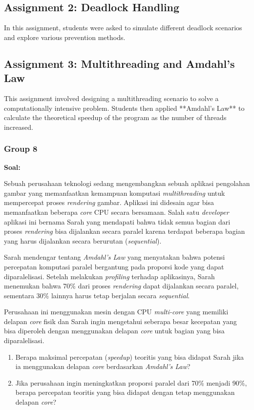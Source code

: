 \documentclass[12pt]{article}
\begin{document}
\subsection{Assignment 2: Deadlock Handling}
In this assignment, students were asked to simulate different deadlock scenarios and explore various prevention methods.

\subsection{Assignment 3: Multithreading and Amdahl's Law}
This assignment involved designing a multithreading scenario to solve a computationally intensive problem. Students then applied **Amdahl's Law** to calculate the theoretical speedup of the program as the number of threads increased.
\subsubsection{Group 8}
\textbf{Soal:}
\par Sebuah perusahaan teknologi sedang mengembangkan sebuah aplikasi pengolahan gambar yang memanfaatkan kemampuan komputasi \textit{multithreading} untuk mempercepat proses \textit{rendering} gambar. Aplikasi ini didesain agar bisa memanfaatkan beberapa \textit{core} CPU secara bersamaan. Salah satu \textit{developer} aplikasi ini bernama Sarah yang mendapati bahwa tidak semua bagian dari proses \textit{rendering} bisa dijalankan secara paralel karena terdapat beberapa bagian yang harus dijalankan secara berurutan (\textit{sequential}).
\par Sarah mendengar tentang \textit{Amdahl’s Law} yang menyatakan bahwa potensi percepatan komputasi paralel bergantung pada proporsi kode yang dapat diparalelisasi. Setelah melakukan \textit{profiling} terhadap aplikasinya, Sarah menemukan bahwa 70\% dari proses \textit{rendering} dapat dijalankan secara paralel, sementara 30\% lainnya harus tetap berjalan secara \textit{sequential}.
\par Perusahaan ini menggunakan mesin dengan CPU \textit{multi-core} yang memiliki delapan \textit{core} fisik dan Sarah ingin mengetahui seberapa besar kecepatan yang bisa diperoleh dengan menggunakan delapan \textit{core} untuk bagian yang bisa diparalelisasi.
\begin{enumerate}
    \item Berapa maksimal percepatan (\textit{speedup}) teoritis yang bisa didapat Sarah jika ia menggunakan delapan \textit{core} berdasarkan \textit{Amdahl’s Law}?
    \item Jika perusahaan ingin meningkatkan proporsi paralel dari 70\% menjadi 90\%, berapa percepatan teoritis yang bisa didapat dengan tetap menggunakan delapan \textit{core}?
\end{enumerate}
\end{document}
